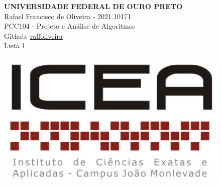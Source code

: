 \documentclass[12pt,a4paper]{article}
\begin{document}
\begin{figure}[H]
\begin{minipage}[]{0.07\linewidth}
	\end{minipage}
\hfill
	\begin{minipage}[]{0.6\linewidth}
		\centering
	\textbf{UNIVERSIDADE FEDERAL DE OURO PRETO\\}
		Rafael Francisco de Oliveira - 2021.10171\\
		PCC104 - Projeto e Análise de Algoritmos\\
		Github: \href{https://github.com/raffoliveira/Master_Degree}{raffoliveira}\\
		Lista 1
		
	\end{minipage}
\hfill	
	\begin{minipage}[c]{0.15\linewidth}
	\includegraphics[width=\linewidth]{images/icea.jpg}	
	\end{minipage}

\vspace{0.5cm}
\hrulefill
\end{figure}
\end{document}
